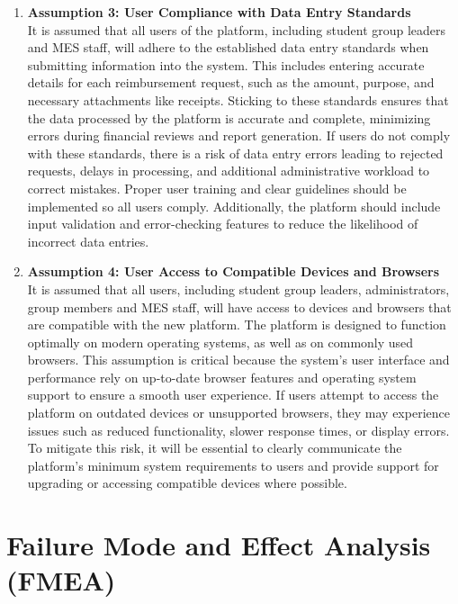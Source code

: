 \documentclass{article}
\begin{document}
\begin{enumerate}
    \item \textbf{Assumption 3: User Compliance with Data Entry Standards} \\
    It is assumed that all users of the platform, including student group leaders and MES staff, will adhere to the established data entry standards when submitting information into the system. This includes entering accurate details for each reimbursement request, such as the amount, purpose, and necessary attachments like receipts. Sticking to these standards ensures that the data processed by the platform is accurate and complete, minimizing errors during financial reviews and report generation. If users do not comply with these standards, there is a risk of data entry errors leading to rejected requests, delays in processing, and additional administrative workload to correct mistakes. Proper user training and clear guidelines should be implemented so all users comply. Additionally, the platform should include input validation and error-checking features to reduce the likelihood of incorrect data entries.

    \item \textbf{Assumption 4: User Access to Compatible Devices and Browsers} \\
    It is assumed that all users, including student group leaders, administrators, group members and MES staff, will have access to devices and browsers that are compatible with the new platform. The platform is designed to function optimally on modern operating systems, as well as on commonly used browsers. This assumption is critical because the system's user interface and performance rely on up-to-date browser features and operating system support to ensure a smooth user experience. If users attempt to access the platform on outdated devices or unsupported browsers, they may experience issues such as reduced functionality, slower response times, or display errors. To mitigate this risk, it will be essential to clearly communicate the platform’s minimum system requirements to users and provide support for upgrading or accessing compatible devices where possible.
    
\end{enumerate}



\section{Failure Mode and Effect Analysis (FMEA)}
\end{document}
